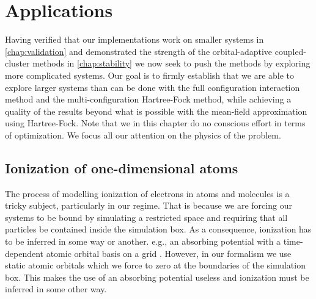 \chapter{Applications}
    Having verified that our implementations work on smaller systems in
    \autoref{chap:validation} and demonstrated the strength of the
    orbital-adaptive coupled-cluster methods in \autoref{chap:stability} we now
    seek to push the methods by exploring more complicated systems.
    Our goal is to firmly establish that we are able to explore larger systems
    than can be done with the full configuration interaction method and the
    multi-configuration Hartree-Fock method, while achieving a quality of the
    results beyond what is possible with the mean-field approximation using
    Hartree-Fock.
    Note that we in this chapter do no conscious effort in terms of
    optimization.
    We focus all our attention on the physics of the problem.

    \section{Ionization of one-dimensional atoms}
        The process of modelling ionization of electrons in atoms and
        molecules is a tricky subject, particularly in our regime.
        That is because we are forcing our systems to be bound by simulating a
        restricted space and requiring that all particles be contained inside
        the simulation box.
        As a consequence, ionization has to be inferred in some way or another.
        e.g., an absorbing potential with a time-dependent atomic orbital basis
        on a grid \cite{kosloff1986363, miyagi_and_madsen, takeshi}.
        However, in our formalism we use static atomic orbitals which we
        force to zero at the boundaries of the simulation box.
        This makes the use of an absorbing potential useless and ionization
        must be inferred in some other way.

